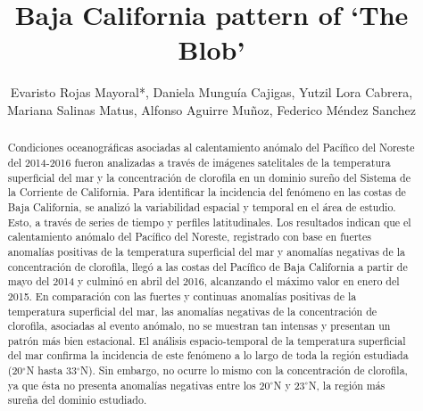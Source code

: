 \documentclass{article} %
\title{Baja California pattern of ‘The Blob’}
\author{Evaristo Rojas Mayoral*, Daniela Munguía Cajigas, Yutzil Lora Cabrera,\\ Mariana
Salinas Matus, Alfonso Aguirre Muñoz, Federico Méndez Sanchez}
\begin{document}
\maketitle

\begin{abstract}
Condiciones oceanográficas asociadas al calentamiento anómalo del Pacífico del Noreste del 2014-2016 fueron analizadas a través de imágenes satelitales de la
temperatura superficial del mar y la concentración de clorofila en un dominio
sureño del Sistema de la Corriente de California. Para identificar la incidencia del
fenómeno en las costas de Baja California, se analizó la variabilidad espacial y
temporal en el área de estudio. Esto, a través de series de tiempo y perfiles
latitudinales. Los resultados indican que el calentamiento anómalo del Pacífico del
Noreste, registrado con base en fuertes anomalías positivas de la temperatura
superficial del mar y anomalías negativas de la concentración de clorofila, llegó a
las costas del Pacífico de Baja California a partir de mayo del 2014 y culminó en
abril del 2016, alcanzando el máximo valor en enero del 2015. En comparación con
las fuertes y continuas anomalías positivas de la temperatura superficial del mar,
las anomalías negativas de la concentración de clorofila, asociadas al evento
anómalo, no se muestran tan intensas y presentan un patrón más bien estacional.
El análisis espacio-temporal de la temperatura superficial del mar confirma la
incidencia de este fenómeno a lo largo de toda la región estudiada (20$^{\circ}$N hasta
33$^{\circ}$N). Sin embargo, no ocurre lo mismo con la concentración de clorofila, ya que
ésta no presenta anomalías negativas entre los 20$^{\circ}$N y 23$^{\circ}$N, la región más sureña del dominio estudiado.
\end{abstract}
\end{document}
